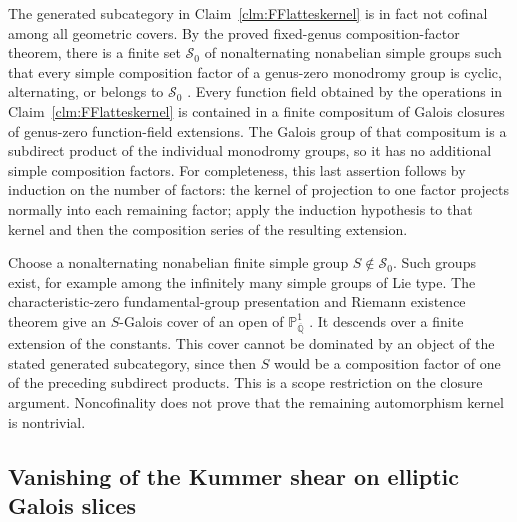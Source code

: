 The generated subcategory in Claim~\ref{clm:FFlatteskernel}
is in fact not cofinal among all geometric covers.
By the proved fixed-genus composition-factor theorem,
there is a finite set \(\mathcal S_0\) of
nonalternating nonabelian simple groups such that every
simple composition factor of a genus-zero monodromy
group is cyclic, alternating, or belongs to
\(\mathcal S_0\)
\citep[Theorem~1.1, with characteristic zero and genus
zero]{FF_Guralnick2003}.
Every function field obtained by the operations in
Claim~\ref{clm:FFlatteskernel} is contained in a finite
compositum of Galois closures of genus-zero function-field
extensions. The Galois group of that compositum is a
subdirect product of the individual monodromy groups,
so it has no additional simple composition factors.
For completeness, this last assertion follows by induction
on the number of factors: the kernel of projection to
one factor projects normally into each remaining factor;
apply the induction hypothesis to that kernel and then
the composition series of the resulting extension.

Choose a nonalternating nonabelian finite simple group
\(S\notin\mathcal S_0\). Such groups exist, for
example among the infinitely many simple groups of
Lie type. The characteristic-zero fundamental-group
presentation and Riemann existence theorem give an
\(S\)-Galois cover of an open of
\(\mathbb P^1_{\overline{\mathbb Q}}\)
\citep[Expos\'es~XII, Th\'eor\`eme~5.1, and~XIII,
Corollaire~2.12]{FF_SGA1}.
It descends over a finite extension of the constants.
This cover cannot be dominated by an object of the
stated generated subcategory, since then \(S\)
would be a composition factor of one of the preceding
subdirect products. This is a scope restriction on the
closure argument. Noncofinality does not prove that the
remaining automorphism kernel is nontrivial.

\subsection{Vanishing of the Kummer shear on elliptic Galois slices}

